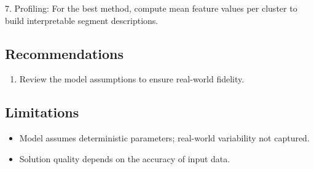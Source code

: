 \documentclass[11pt, a4paper]{article}
\begin{document}
7. Profiling: For the best method, compute mean feature values per cluster to build interpretable segment descriptions.



\subsection{Recommendations}

\begin{enumerate}
  \item Review the model assumptions to ensure real-world fidelity.
\end{enumerate}

\subsection{Limitations}

\begin{polyawarnbox}
\begin{itemize}
  \item Model assumes deterministic parameters; real-world variability not captured.
  \item Solution quality depends on the accuracy of input data.
\end{itemize}
\end{polyawarnbox}

\end{document}
